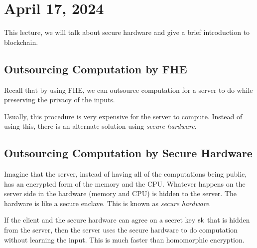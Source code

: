 \section{April 17, 2024}
\label{20240417}

This lecture, we will talk about secure hardware and give a brief introduction to blockchain.

\subsection{Outsourcing Computation by FHE}

Recall that by using FHE, we can outsource computation for a server to do while preserving the privacy of the inputs.


Usually, this procedure is very expensive for the server to compute. Instead of using this, there is an alternate solution using \textit{secure hardware}.

\subsection{Outsourcing Computation by Secure Hardware}

Imagine that the server, instead of having all of the computations being public, has an encrypted form of the memory and the CPU. Whatever happens on the server side in the hardware (memory and CPU) is hidden to the server. The hardware is like a secure enclave. This is known as \textit{secure hardware}.

If the client and the secure hardware can agree on a secret key $\mathrm{sk}$ that is hidden from the server, then the server uses the secure hardware to do computation without learning the input. This is much faster than homomorphic encryption.

